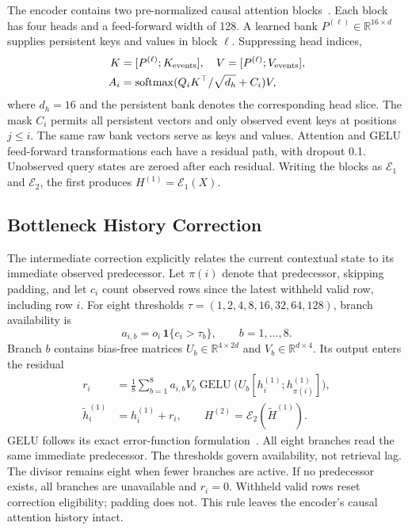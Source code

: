 \documentclass[runningheads]{llncs}
\newcommand{\GELU}{\operatorname{GELU}}
\newcommand{\E}{\mathcal{E}}
\begin{document}
The encoder contains two pre-normalized causal attention
blocks~\cite{vaswani2017attention,ba2016layernorm}. Each block has four heads
and a feed-forward width of 128. A learned bank $P^{(\ell)}\in\mathbb R^{16\times d}$
supplies persistent keys and values in block $\ell$. Suppressing head indices,
\begin{equation}
 \begin{aligned}
 K&=[P^{(\ell)};K_{\rm events}],\quad V=[P^{(\ell)};V_{\rm events}],\\
 A_i&=\operatorname{softmax}(Q_iK^\top/\sqrt{d_h}+C_i)V,
 \end{aligned}
 \label{eq:attention}
\end{equation}
where $d_h=16$ and the persistent bank denotes the corresponding head slice.
The mask $C_i$ permits all persistent vectors and only observed event keys at
positions $j\leq i$. The same raw bank vectors serve as keys and values.
Attention and GELU feed-forward transformations each have a residual path,
with dropout 0.1. Unobserved query states are zeroed after each residual.
Writing the blocks as $\E_1$ and $\E_2$, the first produces $H^{(1)}=\E_1(X)$.

\subsection{Bottleneck History Correction}
The intermediate correction explicitly relates the current contextual state
to its immediate observed predecessor. Let $\pi(i)$ denote that predecessor,
skipping padding, and let $c_i$ count observed rows since the latest withheld
valid row, including row $i$. For eight thresholds
$\tau=(1,2,4,8,16,32,64,128)$, branch availability is
\begin{equation}
 a_{i,b}=o_i\,\mathbf 1\{c_i>\tau_b\},\qquad b=1,\ldots,8.
 \label{eq:availability}
\end{equation}
Branch $b$ contains bias-free matrices $U_b\in\mathbb R^{4\times 2d}$ and
$V_b\in\mathbb R^{d\times4}$. Its output enters the residual
\begin{align}
 r_i&=\frac18\sum_{b=1}^{8}a_{i,b}V_b
       \GELU\bigl(U_b[h_i^{(1)};h_{\pi(i)}^{(1)}]\bigr),\label{eq:correction}\\
 \widetilde h_i^{(1)}&=h_i^{(1)}+r_i,\qquad
 H^{(2)}=\E_2(\widetilde H^{(1)}).\label{eq:insert}
\end{align}
GELU follows its exact error-function formulation~\cite{hendrycks2016gelu}.
All eight branches read the same immediate predecessor. The thresholds govern
availability, not retrieval lag. The divisor remains eight when fewer
branches are active. If no predecessor exists, all branches are unavailable
and $r_i=0$. Withheld valid rows reset correction eligibility; padding does
not. This rule leaves the encoder's causal attention history intact.
\end{document}
